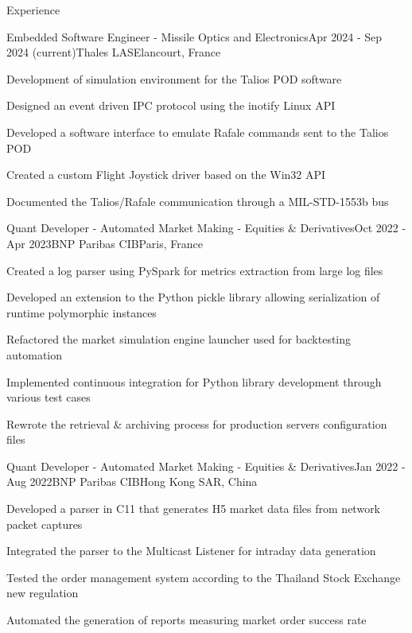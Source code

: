 \documentclass[
	a4paper, %
	10pt, %
]{resume} %
\def\CC{{C\nolinebreak[4]\hspace{-.05em}\raisebox{.4ex}{\tiny\bf ++}}}
\begin{document}
\begin{rSection}{Experience}

	\begin{rSubsection}{Embedded Software Engineer - Missile Optics and Electronics}{Apr 2024 - Sep 2024 (current)}{Thales LAS}{Elancourt, France}
		\item Development of simulation environment for the Talios POD software
    \item Designed an event driven IPC protocol using the inotify Linux API
    \item Developed a software interface to emulate Rafale commands sent to the Talios POD
    \item Created a custom Flight Joystick driver based on the Win32 API
    \item Documented the Talios/Rafale communication through a MIL-STD-1553b bus
	\end{rSubsection}

	\begin{rSubsection}{Quant Developer - Automated Market Making - Equities \& Derivatives}{Oct 2022 - Apr 2023}{BNP Paribas CIB}{Paris, France}
		\item Created a log parser using PySpark for metrics extraction from large log files
		\item Developed an extension to the Python pickle library allowing serialization of runtime polymorphic instances
		\item Refactored the market simulation engine launcher used for backtesting automation
		\item Implemented continuous integration for Python library development through various test cases
		\item Rewrote the retrieval \& archiving process for production servers configuration files
	\end{rSubsection}

	\begin{rSubsection}{Quant Developer - Automated Market Making - Equities \& Derivatives}{Jan 2022 - Aug 2022}{BNP Paribas CIB}{Hong Kong SAR, China}
    \item Developed a parser in \CC11 that generates H5 market data files from network packet captures
		\item Integrated the parser to the Multicast Listener for intraday data generation
		\item Tested the order management system according to the Thailand Stock Exchange new regulation
		\item Automated the generation of reports measuring market order success rate
	\end{rSubsection}

\end{rSection}
\end{document}
